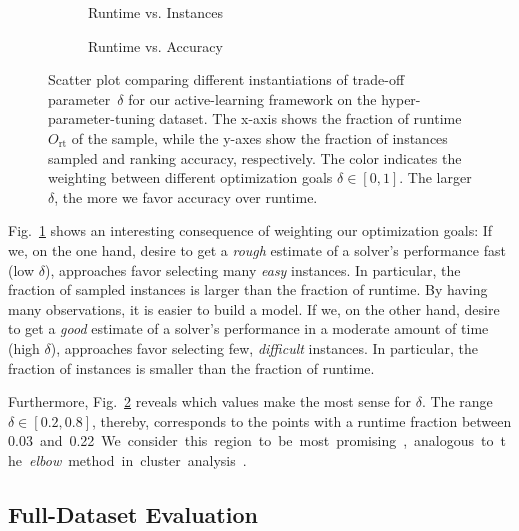 \documentclass[runningheads]{llncs}
\begin{document}
\begin{figure}[tb!]
  \centering
  \begin{subfigure}{0.4775\textwidth}
    \caption{Runtime vs. Instances}
    \label{fig:annitrainoptgoalruntime}
  \end{subfigure}
  \begin{subfigure}{0.5125\textwidth}
    \caption{Runtime vs. Accuracy}
    \label{fig:annitrainoptgoalacc}
  \end{subfigure}

  \caption{
    Scatter plot comparing different instantiations of trade-off parameter~$\delta$ for our active-learning framework on the hyper-parameter-tuning dataset.
    The x-axis shows the fraction of runtime $O_{\operatorname{rt}}$ of the sample, while the y-axes show the fraction of instances sampled and ranking accuracy, respectively.
    The color indicates the weighting between different optimization goals $\delta \in \left[0, 1\right]$.
    The larger $\delta$, the more we favor accuracy over runtime.
  }
  \label{fig:annitrainoptgoal}
\end{figure}

Fig.~\ref{fig:annitrainoptgoalruntime} shows an interesting consequence of weighting our optimization goals:
If we, on the one hand, desire to get a \emph{rough} estimate of a solver's performance fast (low $\delta$), approaches favor selecting many \emph{easy} instances.
In particular, the fraction of sampled instances is larger than the fraction of runtime.
By having many observations, it is easier to build a model.
If we, on the other hand, desire to get a \emph{good} estimate of a solver's performance in a moderate amount of time (high $\delta$), approaches favor selecting few, \emph{difficult} instances.
In particular, the fraction of instances is smaller than the fraction of runtime.

Furthermore, Fig.~\ref{fig:annitrainoptgoalacc} reveals which values make the most sense for $\delta$.
The range $\delta \in \left[0.2, 0.8\right]$, thereby, corresponds to the points with a runtime fraction between \SI{0.03} and \SI{0.22}.
We consider this region to be most promising, analogous to the \emph{elbow} method in cluster analysis~\cite{kodinariya2013review}.

\subsection{Full-Dataset Evaluation}
\end{document}
